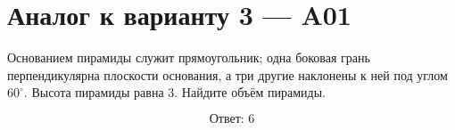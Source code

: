 \documentclass[12pt,a4paper]{article}
\begin{document}
\section*{Аналог к варианту 3 — A01}

Основанием пирамиды служит прямоугольник; одна боковая грань перпендикулярна плоскости основания, а три другие наклонены к ней под углом \(60^\circ\). Высота пирамиды равна \(3\). Найдите объём пирамиды.

\begin{center}
\end{center}

\[
\boxed{\text{Ответ: }6}
\]
\end{document}
